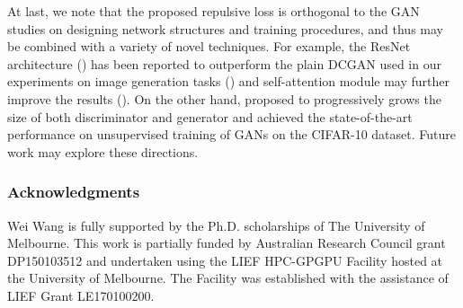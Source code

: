 \documentclass{article} %
\theoremstyle{plain}
\newtheorem*{proposition 1*}{Proposition 1}
\begin{document}
At last, we note that the proposed repulsive loss is orthogonal to the GAN studies on designing network structures and training procedures, and thus may be combined with a variety of novel techniques. For example, the ResNet architecture (\cite{resnet}) has been reported to outperform the plain DCGAN used in our experiments on image generation tasks (\cite{spectral,wgan_gp}) and self-attention module may further improve the results (\cite{attention}). On the other hand, \cite{pggan} proposed to progressively grows the size of both discriminator and generator and achieved the state-of-the-art performance on unsupervised training of GANs on the CIFAR-10 dataset. Future work may explore these directions. 

\subsubsection*{Acknowledgments}

Wei Wang is fully supported by the Ph.D. scholarships of The University of Melbourne. This work is partially funded by Australian Research Council grant DP150103512 and undertaken using the LIEF HPC-GPGPU Facility hosted at the University of Melbourne. The Facility was established with the assistance of LIEF Grant LE170100200. 



\end{document}
